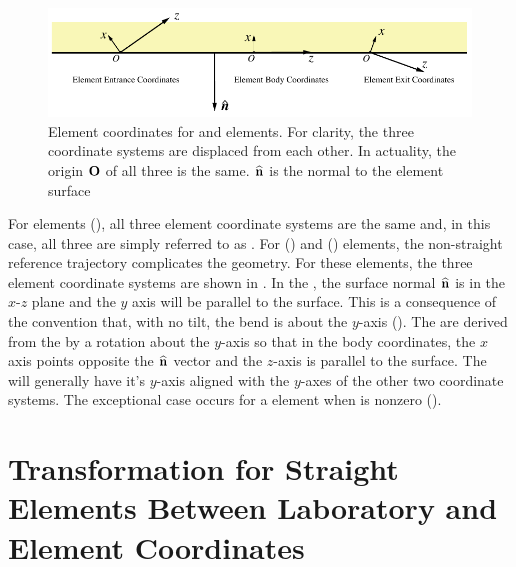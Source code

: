 \begin{figure}[tb]
  \centering
  \includegraphics[width=5in]{photon-ele-coords.pdf}
  \caption[Crystal and Mirror Element Coordinates.]
{Element coordinates for  and  elements. For
clarity, the three coordinate systems are displaced from each
other. In actuality, the origin ${\bf O}$ of all three is the same.
${\widehat{\bf n}}$ is the normal to the element surface}
  \label{f:photon.ele.coords}
\end{figure}

For  elements (), all three element
coordinate systems are the same and, in this case, all three are
simply referred to as .  For 
() and  () elements, the
non-straight reference trajectory complicates the geometry. For these
elements, the three element coordinate systems are shown in
. In the , the surface normal ${\widehat{\bf n}}$ is in the $x$-$z$ plane
and the $y$ axis will be parallel to the surface. This is a
consequence of the convention that, with no tilt, the bend is about
the $y$-axis (). The  are
derived from the  by a rotation about
the $y$-axis so that in the body coordinates, the $x$ axis points
opposite the ${\widehat{\bf n}}$ vector and the $z$-axis is parallel to the
surface. The  will generally have it's
$y$-axis aligned with the $y$-axes of the other two coordinate
systems. The exceptional case occurs for a  element when
 is nonzero ().

\section{Transformation for Straight Elements Between 
Laboratory and Element Coordinates}
\label{s:straight.lab.ele}

